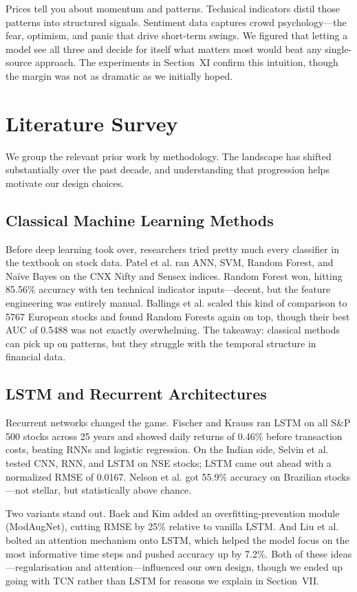 \documentclass[conference]{IEEEtran}
\begin{document}
Prices tell you about momentum and patterns. Technical indicators distil those patterns into structured signals. Sentiment data captures crowd psychology---the fear, optimism, and panic that drive short-term swings. We figured that letting a model see all three and decide for itself what matters most would beat any single-source approach. The experiments in Section~XI confirm this intuition, though the margin was not as dramatic as we initially hoped.

\section{Literature Survey}
We group the relevant prior work by methodology. The landscape has shifted substantially over the past decade, and understanding that progression helps motivate our design choices.

\subsection{Classical Machine Learning Methods}
Before deep learning took over, researchers tried pretty much every classifier in the textbook on stock data. Patel et al. \cite{patel2015} ran ANN, SVM, Random Forest, and Na\"ive Bayes on the CNX Nifty and Sensex indices. Random Forest won, hitting 85.56\% accuracy with ten technical indicator inputs---decent, but the feature engineering was entirely manual. Ballings et al. \cite{ballings2015} scaled this kind of comparison to 5767 European stocks and found Random Forests again on top, though their best AUC of 0.5488 was not exactly overwhelming. The takeaway: classical methods can pick up on patterns, but they struggle with the temporal structure in financial data.

\subsection{LSTM and Recurrent Architectures}
Recurrent networks changed the game. Fischer and Krauss \cite{fischer2018} ran LSTM on all S\&P 500 stocks across 25 years and showed daily returns of 0.46\% before transaction costs, beating RNNs and logistic regression. On the Indian side, Selvin et al. \cite{selvin2017} tested CNN, RNN, and LSTM on NSE stocks; LSTM came out ahead with a normalized RMSE of 0.0167. Nelson et al. \cite{nelson2017} got 55.9\% accuracy on Brazilian stocks---not stellar, but statistically above chance.

Two variants stand out. Baek and Kim \cite{baek2018} added an overfitting-prevention module (ModAugNet), cutting RMSE by 25\% relative to vanilla LSTM. And Liu et al. \cite{liu2019} bolted an attention mechanism onto LSTM, which helped the model focus on the most informative time steps and pushed accuracy up by 7.2\%. Both of these ideas---regularisation and attention---influenced our own design, though we ended up going with TCN rather than LSTM for reasons we explain in Section~VII.
\end{document}
